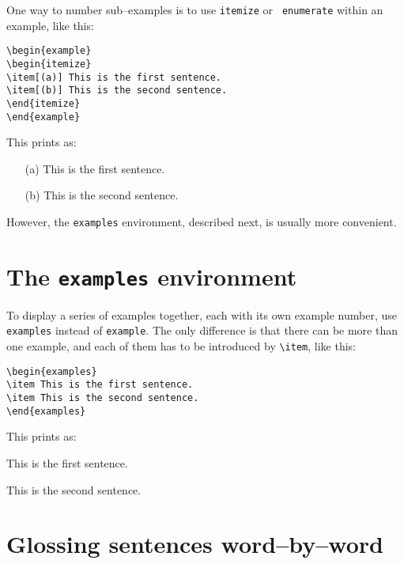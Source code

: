 \documentclass{article}
\begin{document}
One way to number sub--examples is to use {\tt itemize} or {\tt 
enumerate} within an example, like this:
\begin{verbatim}
\begin{example}
\begin{itemize}
\item[(a)] This is the first sentence.
\item[(b)] This is the second sentence.
\end{itemize}
\end{example}
\end{verbatim}
This prints as:
\begin{example}
\begin{itemize}
\item[(a)] This is the first sentence.
\item[(b)] This is the second sentence.
\end{itemize}
\end{example}
However, the {\tt examples} environment, described next, is usually more 
convenient.

\section{The {\tt examples} environment}

To display a series of examples together, each with its own example 
number, use {\tt examples} instead of {\tt example}.  The only 
difference is that there can be more than one example, and each of them 
has to be introduced by \verb"\item", like this:
\begin{verbatim}
\begin{examples}
\item This is the first sentence.
\item This is the second sentence.
\end{examples}
\end{verbatim}
This prints as:
\begin{examples}
\item This is the first sentence.
\item This is the second sentence.
\end{examples}


\section{Glossing sentences word--by--word}
\end{document}
